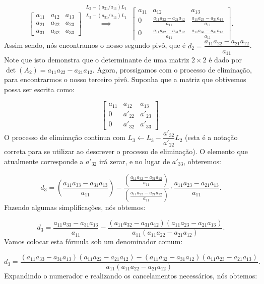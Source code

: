 $$
\begin{bmatrix}
	a_{11} & a_{12} & a_{13} \\
	a_{21} & a_{22} & a_{23} \\
	a_{31} & a_{32} & a_{33}
\end{bmatrix}\overset{\substack{L_2 - (a_{21}/a_{11})L_1 \\ L_3 - (a_{31}/a_{11})L_1}}{\implies} \begin{bmatrix}
	a_{11} & a_{12} & a_{13} \\
	0 & \frac{a_{11}a_{22} - a_{21}a_{12}}{a_{11}} & \frac{a_{11}a_{23} - a_{21}a_{13}}{a_{11}} \\
	0 & \frac{a_{11}a_{32} - a_{31}a_{12}}{a_{11}} & \frac{a_{11}a_{33} - a_{31}a_{13}}{a_{11}}
\end{bmatrix}.
$$
Assim sendo, nós encontramos o nosso segundo pivô, que é $d_2 = \dfrac{a_{11}a_{22} - a_{21}a_{12}}{a_{11}}$. Note que isto demonstra que o determinante de uma matriz $2\times 2$ é dado por $\det(A_2) = a_{11}a_{22} - a_{21}a_{12}$. Agora, prossigamos com o processo de eliminação, para encontrarmos o nosso terceiro pivô. Suponha que a matriz que obtivemos possa ser escrita como:

$$
\begin{bmatrix}
	a_{11} & a_{12} & a_{13} \\
	0 & a'_{22} & a'_{23} \\
	0 & a'_{32} & a'_{33}
\end{bmatrix}.
$$
O processo de eliminação continua com $L_3 \leftarrow L_3 - \dfrac{a'_{32}}{a'_{22}}L_2$ (esta é a notação correta para se utilizar ao descrever o processo de eliminação). O elemento que atualmente corresponde a $a'_{32}$ irá zerar, e no lugar de $a'_{33}$, obteremos:

$$
d_3 = \left(\dfrac{a_{11}a_{33} - a_{31}a_{13}}{a_{11}}\right) - \dfrac{\left(\frac{a_{11}a_{32} - a_{31}a_{12}}{a_{11}}\right)}{\left(\frac{a_{11}a_{22} - a_{21}a_{12}}{a_{11}}\right)}\cdot\dfrac{a_{11}a_{23} - a_{21}a_{13}}{a_{11}}.
$$
Fazendo algumas simplificações, nós obtemos:

$$
d_3 = \dfrac{a_{11}a_{33} - a_{31}a_{13}}{a_{11}} - \dfrac{(a_{11}a_{32} - a_{31}a_{12})(a_{11}a_{23} - a_{21}a_{13})}{a_{11}(a_{11}a_{22} - a_{21}a_{12})}.
$$
Vamos colocar esta fórmula sob um denominador comum:

$$
d_3 = \dfrac{(a_{11}a_{33} - a_{31}a_{13})(a_{11}a_{22} - a_{21}a_{12}) - (a_{11}a_{32} - a_{31}a_{12})(a_{11}a_{23} - a_{21}a_{13})}{a_{11}(a_{11}a_{22} - a_{21}a_{12})}.
$$
Expandindo o numerador e realizando os cancelamentos necessários, nós obtemos:

